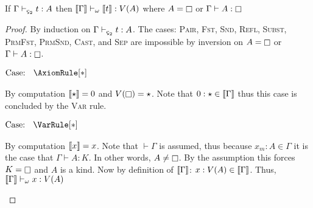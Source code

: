 \begin{theorem}
    \label{lem:3:soundness_of_sema}
    If $\Gamma \vdash_{\ced} t : A$ then $\llbracket \Gamma \rrbracket \vdash_\omega \llbracket t \rrbracket : V(A)$
    where $A = \kind$ or $\Gamma \vdash A : \kind$
\end{theorem}
\begin{proof}
    By induction on $\Gamma \vdash_{\ced} t : A$.
    The cases: \textsc{Pair}, \textsc{Fst}, \textsc{Snd}, \textsc{Refl}, \textsc{Subst}, \textsc{PrmFst}, \textsc{PrmSnd}, \textsc{Cast}, and \textsc{Sep} are impossible by inversion on $A = \kind$ or $\Gamma \vdash A : \kind$.

    $\text{Case: }\begin{array}{c} \AxiomRule[*] \end{array}$
    \begin{proofcase}
        By computation $\llbracket \star \rrbracket = 0$ and $V(\kind) = \star$.
        Note that $0 : \star \in \llbracket \Gamma \rrbracket$ thus this case is concluded by the \textsc{Var} rule.
    \end{proofcase}

    $\text{Case: }\begin{array}{c} \VarRule[*] \end{array}$
    \begin{proofcase}
        By computation $\llbracket x \rrbracket = x$.
        Note that $\vdash \Gamma$ is assumed, thus because $x_m : A \in \Gamma$ it is the case that $\Gamma \vdash A : K$.
        In other words, $A \neq \kind$.
        By the assumption this forces $K = \kind$ and $A$ is a kind.
        Now by definition of $\llbracket \Gamma \rrbracket$: $x : V(A) \in \llbracket \Gamma \rrbracket$.
        Thus, $\llbracket \Gamma \rrbracket \vdash_\omega x : V(A)$
    \end{proofcase}


\end{proof}
